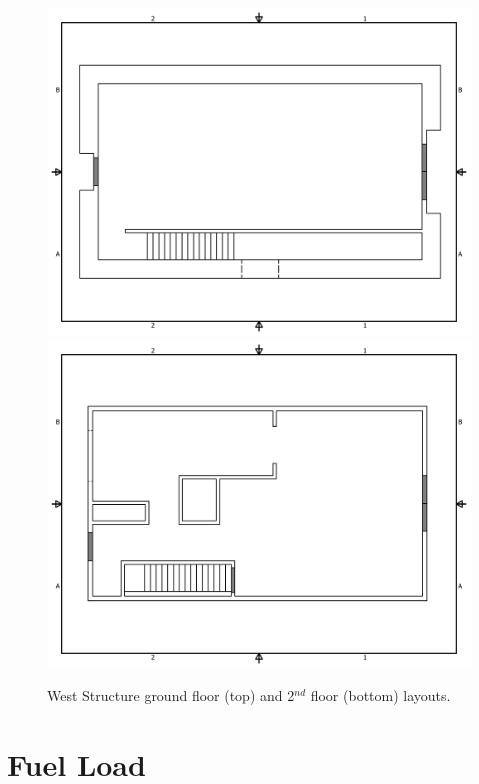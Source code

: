 \documentclass[12pt,oneside]{book}
\begin{document}
\clearpage

\begin{figure}[!ht]
\includegraphics[width=6in]{Drawings/PDFs/West_Structure_Test_General_1st_Floor}
\\
\includegraphics[width=6in]{Drawings/PDFs/West_Structure_Test_General_2nd_Floor}
\caption{West Structure ground floor (top) and 2$^{nd}$ floor (bottom) layouts.}
\label{fig:west_drawing_general}
\end{figure}

\clearpage
\section{Fuel Load}
\end{document}
